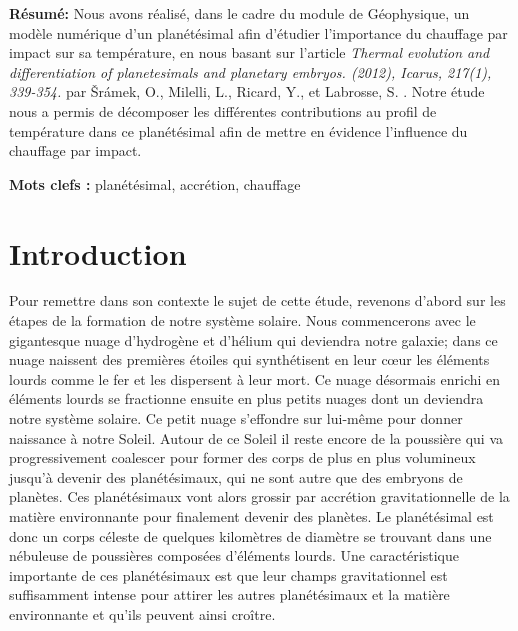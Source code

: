 \documentclass[10pt,a4paper]{article}
\numberwithin{equation}{section}
\begin{document}
\begin{titlepage}
\vspace{0.5cm}

\textbf{Résumé:} 
Nous avons réalisé, dans le cadre du module de Géophysique, un modèle numérique d'un planétésimal afin d'étudier l'importance du chauffage par impact sur sa température, en nous basant sur l'article \textit{Thermal evolution and differentiation of planetesimals and planetary embryos. (2012), Icarus, 217(1), 339-354.} par Šrámek, O., Milelli, L., Ricard, Y., et Labrosse, S. .  Notre étude nous a permis de décomposer les différentes contributions au profil de température dans ce planétésimal afin de mettre en évidence l'influence du chauffage par impact.
\vspace{0.3cm}

\textbf{Mots clefs :} planétésimal, accrétion, chauffage
\vspace{0.3cm}



\tableofcontents

\end{titlepage}


\newpage
\renewcommand\thepage{\arabic{page}}

\setcounter{page}{1}

\section*{Introduction}

Pour remettre dans son contexte le sujet de cette étude, revenons d'abord sur les étapes de la formation de notre système solaire. Nous commencerons avec le gigantesque nuage d'hydrogène et d'hélium qui deviendra notre galaxie; dans ce nuage naissent des premières étoiles qui synthétisent en leur cœur les éléments lourds comme le fer et les dispersent à leur mort. Ce nuage désormais enrichi en éléments lourds se fractionne ensuite en plus petits nuages dont un deviendra notre système solaire. Ce petit nuage s'effondre sur lui-même pour donner naissance à notre Soleil. Autour de ce Soleil il reste encore de la poussière qui va progressivement coalescer pour former des corps de plus en plus volumineux jusqu'à devenir des planétésimaux, qui ne sont autre que des embryons de planètes. Ces planétésimaux vont alors grossir par accrétion gravitationnelle de la matière environnante pour finalement devenir des planètes. Le planétésimal est donc un corps céleste de quelques kilomètres de diamètre se trouvant dans une nébuleuse de poussières composées d'éléments lourds. Une caractéristique importante de ces planétésimaux est que leur champs gravitationnel est suffisamment intense pour attirer les autres planétésimaux et la matière environnante et qu'ils peuvent ainsi croître.
\end{document}
